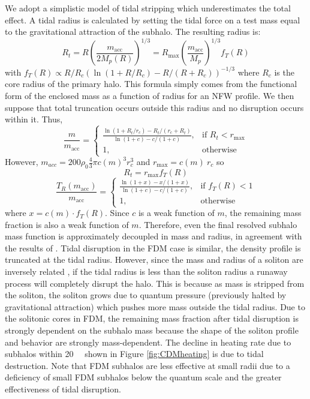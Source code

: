 \documentclass[usenatbib]{mnras}
\begin{document}
We adopt a simplistic model of tidal stripping which underestimates the total effect. A tidal radius is calculated by setting the tidal force on a test mass equal to the gravitational attraction of the subhalo. The resulting radius is:
\begin{equation}
R_t = R \left(\frac{m_{\text{acc}}}{2M_p(R)}\right)^{1/3} =  R_{\text{max}} \left(\frac{m_{\text{acc}}}{M_p}\right)^{1/3} f_T(R)
\end{equation} 
with $f_T(R) \propto R/R_c(\ln(1+R/R_c) - R/(R+R_c))^{-1/3}$ where $R_c$ is the core radius of the primary halo. This formula simply comes from the functional form of the enclosed mass as a function of radius for an NFW profile. We then suppose that total truncation occurs outside this radius and no disruption occurs within it. Thus,
\begin{equation}
\frac{m}{m_{\text{acc}}} = 
\begin{cases}
\frac{\ln{(1+R_t/r_c)} - R_t/(r_c+R_t)}{\ln{(1+c)} - c/(1+c)},
& \text{if } R_t < r_{\text{max}}
\\
    1,              & \text{otherwise}
\end{cases}
\end{equation} 
However, $m_{acc} = 200 \rho_0 \frac{4}{3} \pi c(m)^3 r_c^3$ and $r_{\text{max}} = c(m) \: r_{c}$ so 
\begin{equation}
R_t = r_{\text{max}} f_T(R)
\end{equation}
\begin{equation} \label{trunc}
\frac{T_R(m_{\text{acc}})}{m_{\text{acc}}} =
\begin{cases}
\frac{\ln{(1 + x)} - x/(1 + x)}{\ln{(1+c)} - c/(1+c)},& \text{if } f_T(R) < 1
\\
1, & \text{otherwise}
\end{cases}
\end{equation} 
where $x = c(m) \cdot f_T(R)$. Since $c$ is a weak function of $m$, the remaining mass fraction is also a weak function of $m$. Therefore, even the final resolved subhalo mass function is approximately decoupled in mass and radius, in agreement with the results of \citet{unified_model}. Tidal disruption in the FDM case is similar, the density profile is truncated at the tidal radius. However, since the mass and radius of a soliton are inversely related \citep{solitons}, if the tidal radius is less than the soliton radius a runaway process will completely disrupt the halo. This is because as mass is stripped from the soliton, the soliton grows due to quantum pressure (previously halted by gravitational attraction) which pushes more mass outside the tidal radius. Due to the solitonic cores in FDM, the remaining mass fraction after tidal disruption is strongly dependent on the subhalo mass because the shape of the soliton profile and behavior are strongly mass-dependent. The decline in heating rate due to subhalos within \SI{20}{\kilo\parsec} shown in Figure \ref{fig:CDMheating} is due to tidal destruction. Note that FDM subhalos are less effective at small radii due to a deficiency of small FDM subhalos below the quantum scale and the greater effectiveness of tidal disruption. 
\end{document}
